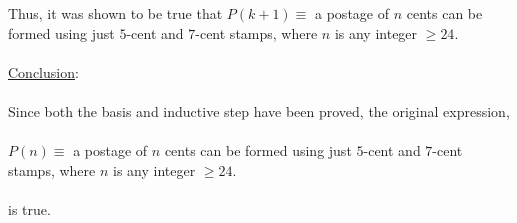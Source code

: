 \documentclass[12pt]{article}
\newcommand{\xconclusion}[1]{
    \underline{Conclusion}:
    \\ \\
    #1
    \\ \\
}
\begin{document}
Thus, it was shown to be true that $P(k+1) \equiv$ a postage of $n$ cents can be formed using just $5$-cent and $7$-cent stamps, where $n$ is any integer $\geq 24$. \\ \\
\xconclusion{
    Since both the basis and inductive step have been proved, the original expression, \\ \\
    $P(n) \equiv$ a postage of $n$ cents can be formed using just $5$-cent and $7$-cent stamps, where $n$ is any integer $\geq 24$. \\ \\
    is true.
}
\end{document}
